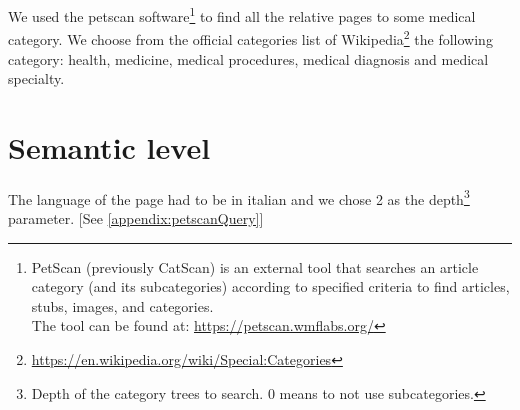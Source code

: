 We used the petscan software\footnote{PetScan (previously CatScan) is an external tool that searches an article category (and its subcategories) according to specified criteria to find articles, stubs, images, and categories.\\The tool can be found at: \url{https://petscan.wmflabs.org/}} to find all the relative pages to some medical category. We choose from the official categories list of Wikipedia\footnote{\url{https://en.wikipedia.org/wiki/Special:Categories}} the following category: health, medicine, medical procedures, medical diagnosis and medical specialty.

\section{Semantic level}
The language of the page had to be in italian and we chose 2 as the depth\footnote{Depth of the category trees to search. 0 means to not use subcategories.} parameter. [See \ref{appendix:petscanQuery}]

